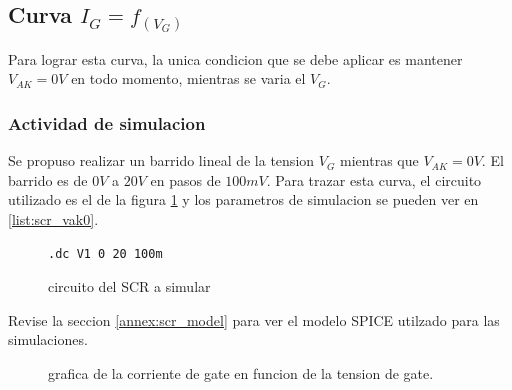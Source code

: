     \subsection{Curva $I_G = f_{(V_G)}$}
      Para lograr esta curva, la unica condicion que se debe aplicar es mantener $V_{AK} = 0V$ en todo momento,
      mientras se varia el $V_G$.

      \subsubsection{Actividad de simulacion}
        Se propuso realizar un barrido lineal de la tension $V_G$ mientras que $V_{AK} = 0V$. El barrido es de $0V$ a
        $20V$ en pasos de $100mV$. Para trazar esta curva, el circuito utilizado es el de la figura \ref{crkt:scr_vak0}
        y los parametros de simulacion se pueden ver en \ref{list:scr_vak0}.
        \begin{figure}[!ht]
          \centering
          \begin{minipage}{0.45\textwidth}
            \centering
            
            \caption{circuito del SCR a simular}
            \label{crkt:scr_vak0}
          \end{minipage}
          \hfill
          \begin{minipage}{0.45\textwidth}
            \centering
          \begin{lstlisting}[style=ltspice, caption={Parámetros de simulación LTspice}, label=list:scr_vak0]
.dc V1 0 20 100m
          \end{lstlisting}
          \end{minipage}
        \end{figure}

      Revise la seccion \ref{annex:scr_model} para ver el modelo SPICE utilzado para las simulaciones.
      \begin{figure}[!ht]
          \caption{grafica de la corriente de gate en funcion de la tension de gate.}
          \label{graph:scr_ig_vg_vak0}
      \end{figure}

